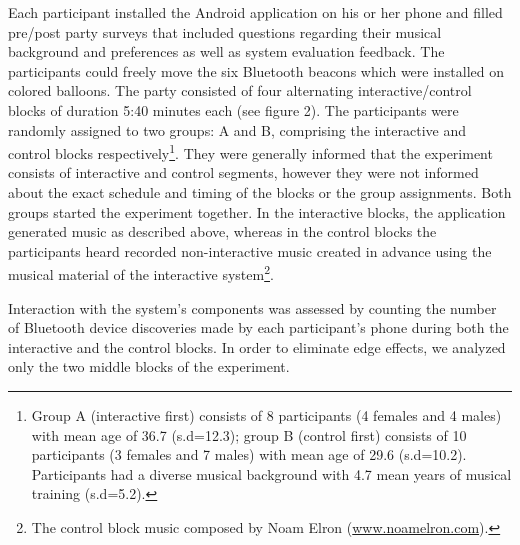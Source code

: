 Each participant installed the Android application on his or her phone and filled pre/post party surveys that included questions regarding their musical background and preferences as well as system evaluation feedback. The participants could freely move the six Bluetooth beacons which were installed on colored balloons. The party consisted of four alternating interactive/control blocks of duration 5:40 minutes each (see figure 2). The participants were randomly assigned to two groups: A and B, comprising the interactive and control blocks respectively\footnote{Group A (interactive first) consists of 8 participants (4 females and 4 males) with mean age of 36.7 (s.d=12.3); group B (control first) consists of 10 participants (3 females and 7 males) with mean age of 29.6 (s.d=10.2). Participants had a diverse musical background with 4.7 mean years of musical training (s.d=5.2).}. They were generally informed that the experiment consists of interactive and control segments, however they were not informed about the exact schedule and timing of the blocks or the group assignments. Both groups started the experiment together. In the interactive blocks, the application generated music as described above, whereas in the control blocks the participants heard recorded non-interactive music created in advance using the musical material of the interactive system\footnote{The control block music composed by Noam Elron (\href{http://www.noamelron.com}{www.noamelron.com}).}.

Interaction with the system’s components was assessed by counting the number of Bluetooth device discoveries made by each participant’s phone during both the interactive and the control blocks. In order to eliminate edge effects, we analyzed only the two middle blocks of the experiment.